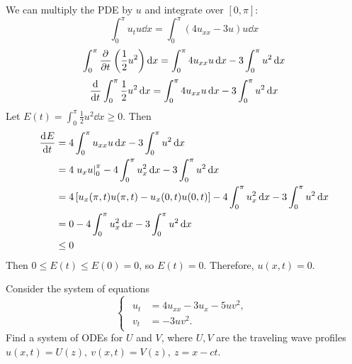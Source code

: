 \documentclass[plain]{pset}
\begin{document}
\begin{solution}
    We can multiply the PDE by \(u\) and integrate over \([0, \pi]\):
    \[\int_0^\pi u_t u \dd x = \int_0^\pi (4u_{xx} - 3u)u \dd x\]
    \[\int_0^\pi \frac{\partial^{} }{\partial t^{}}\left(\frac{1}{2}u^2\right) \mathop{}\!\mathrm{d} x = \int_0^\pi 4u_{xx}u \mathop{}\!\mathrm{d} x - 3\int_0^\pi u^2 \mathop{}\!\mathrm{d} x\]
    \[\frac{\mathop{}\!\mathrm{d}^{} }{\mathop{}\!\mathrm{d} t^{}} \int_0^\pi \frac{1}{2}u^2 \mathop{}\!\mathrm{d} x = \int_0^\pi 4u_{xx}u \mathop{}\!\mathrm{d} x - 3\int_0^\pi u^2 \mathop{}\!\mathrm{d} x\]
    Let \(E(t) = \int_0^\pi \frac{1}{2}u^2 \dd x \geq 0\). Then
    \begin{align*}
        \dv{E}{t} & = 4\int_0^\pi u_{xx}u \dd x - 3\int_0^\pi u^2 \dd x                                                       \\
                  & = 4\left.u_x u\right|_0^\pi - 4\int_0^\pi u_x^2 \dd x - 3\int_0^\pi u^2 \dd x                             \\
                  & = 4\left[u_x(\pi, t)u(\pi, t) - u_x(0, t)u(0, t)\right] - 4\int_0^\pi u_x^2 \dd x - 3\int_0^\pi u^2 \dd x \\
                  & = 0 - 4\int_0^\pi u_x^2 \dd x - 3\int_0^\pi u^2 \dd x                                                     \\
                  & \leq 0
    \end{align*}
    Then \(0 \leq E(t) \leq E(0) = 0\), so \(E(t) = 0\). Therefore, \(u(x, t) = 0\).
\end{solution}

\pagebreak

\begin{problem}
Consider the system of equations
\[
    \begin{cases}
        \begin{aligned}
            u_t & = 4u_{xx} - 3u_x - 5uv^2, \\
            v_t & = -3uv^2.
        \end{aligned}
    \end{cases}
\]
Find a system of ODEs for \(U\) and \(V\), where \(U, V\) are the traveling wave profiles \(u(x, t) = U(z), \ v(x, t) = V(z), \ z = x - ct\).
\end{problem}
\end{document}
